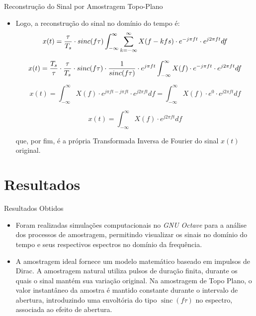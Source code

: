 \documentclass{beamer}
\begin{document}
\begin{frame}{Reconstrução do Sinal por Amostragem Topo-Plano}
    \begin{itemize}
        \item Logo, a reconstrução do sinal no domínio do tempo é:
        \begin{equation}
                    x(t) = {{\tau}\over {T_s}} \cdot sinc(f\tau)\int_{-\infty}^{\infty} \sum_{k=-\infty}^{\infty} X(f-kfs) \cdot e^{-j\pi ft} \cdot e^{j2\pi ft} df
        \end{equation}

        \begin{equation*}
                    x(t) = \frac{T_s}{\tau} \cdot {{\tau}\over {T_s}} \cdot sinc(f\tau) \cdot \frac{1}{sinc(f\tau)} \cdot e^{j\pi ft} \int_{-\infty}^{\infty} X(f) \cdot e^{-j\pi ft} \cdot e^{j2\pi ft} df
        \end{equation*}

        \begin{equation*}
                    x(t) = \int_{-\infty}^{\infty} X(f) \cdot e^{j\pi ft - j\pi ft}\cdot e^{j2\pi ft} df = \int_{-\infty}^{\infty} X(f) \cdot e^{0}\cdot e^{j2\pi ft} df
        \end{equation*}

        \begin{equation}
            x(t) = \int_{-\infty}^{\infty} X(f) \cdot e^{j2\pi ft} df
        \end{equation}

        que, por fim, é a própria Transformada Inversa de Fourier do sinal $x(t)$ original.
    \end{itemize}
\end{frame}

\section{Resultados}

\begin{frame}{Resultados Obtidos}
\begin{itemize}
    \item Foram realizadas simulações computacionais no \textit{GNU Octave}
para a análise dos processos de amostragem, permitindo visualizar
os sinais no domínio do tempo e seus respectivos espectros no
domínio da frequência.
    \item A amostragem ideal fornece um modelo matemático baseado em impulsos
de Dirac. A amostragem natural utiliza pulsos de duração finita,
durante os quais o sinal mantém sua variação original. Na amostragem
de Topo Plano, o valor instantâneo da amostra é mantido constante durante
o intervalo de abertura, introduzindo uma envoltória do tipo
$\operatorname{sinc}(f\tau)$ no espectro, associada ao efeito de
abertura.
\end{itemize}

\end{frame}
\end{document}
